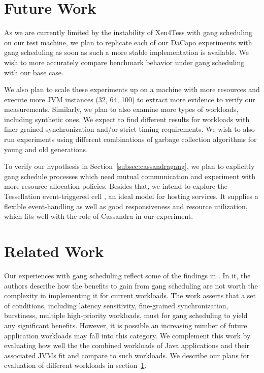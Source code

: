 \documentclass{sig-alternate}
\begin{document}
\section{Future Work} \label{sec:futurework}
As we are currently limited by the instability of Xen4Tess with gang scheduling on our test machine, we plan to replicate each of our DaCapo experiments with gang scheduling as soon as such a more stable implementation is available. We wish to more accurately compare benchmark behavior under gang scheduling with our base case.

We also plan to scale these experiments up on a machine with more resources and execute more JVM instances (32, 64, 100) to extract more evidence to verify our measurements. Similarly, we plan to also examine more types of workloads, including synthetic ones. We expect to find different results for workloads with finer grained synchronization and/or strict timing requirements. We wish to also run experiments using different combinations of garbage collection algorithms for young and old generations.

To verify our hypothesis in Section~\ref{subsec:cassandragang}, we plan to explicitly gang schedule processes which need mutual communication and experiment with more resource allocation policies. Besides that, we intend to explore the Tessellation event-triggered cell \cite{colmenares2013tessellation}, an ideal model for hosting services. It supplies a flexible event-handling as well as good responsiveness and resource utilization, which fits well with the role of Cassandra in our experiment.

\section{Related Work} \label{sec:relatedwork}
Our experiences with gang scheduling reflect some of the findings in \cite{peter2011technical}. In it, the authors describe how the benefits to gain from gang scheduling are not worth the complexity in implementing it for current workloads. The work asserts that a set of conditions, including latency sensitivity, fine-grained synchronization, burstiness, multiple high-priority workloads, must for gang scheduling to yield any significant benefits. However, it is possible an increasing number of future application workloads may fall into this category. We complement this work by evaluating how well the the combined workloads of Java applications and their associated JVMs fit and compare to such workloads. We describe our plans for evaluation of different workloads in section~\ref{sec:futurework}.
\end{document}
